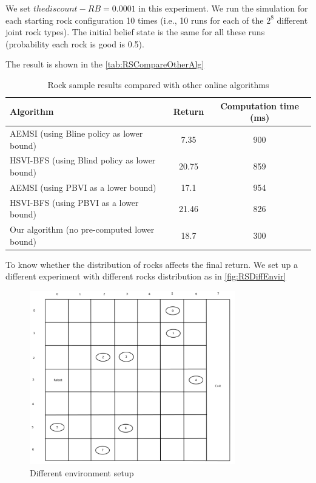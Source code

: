 \documentclass{article}
\begin{document}
We set $the discount-RB=0.0001$ in this experiment. We run the simulation for each starting rock
configuration 10 times (i.e., 10 runs for each of the $2^8$ different joint rock types). The
initial belief state is the same for all these runs (probability each rock is good is 0.5).

The result is shown in the \autoref{tab:RSCompareOtherAlg}

\begin{table}[H]
\begin{center}
	\begin{tabular} {| l | c | c |}
		\hline \hline
		Algorithm & Return & Computation time (ms) \\
		\hline
		AEMSI (using Bline policy as lower bound) & 7.35 & 900 \\
		\hline
		HSVI-BFS (using Blind policy as lower bound) & 20.75 & 859 \\
		\hline
		AEMSI (using PBVI as a lower bound) & 17.1 & 954 \\
		\hline
		HSVI-BFS (using PBVI as a lower bound) & 21.46 & 826 \\
		\hline
		Our algorithm (no pre-computed lower bound) & 18.7 & 300 \\
		\hline \hline
	\end{tabular}
\end{center}
\caption{Rock sample results compared with other online algorithms}
\label{tab:RSCompareOtherAlg}
\end{table}

To know whether the distribution of rocks affects the final return. We set up a different
experiment with different rocks distribution as in \autoref{fig:RSDiffEnvir}

\begin{figure}[h!]
\centering
\includegraphics[width=0.8\textwidth]{Diff-Envir-Rock-Sample.png}
\caption{Different environment setup}
\label{fig:RSDiffEnvir}
\end{figure}
\end{document}
